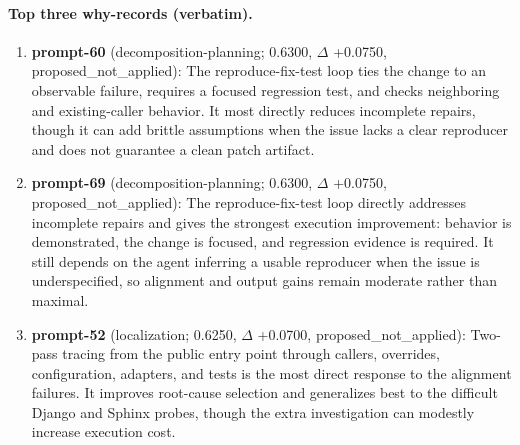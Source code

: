 \paragraph{Top three why-records (verbatim).}\begin{enumerate}\itemsep1pt
\item \textbf{prompt-60} (decomposition-planning; 0.6300, $\Delta$ +0.0750, proposed\_not\_applied): The reproduce-fix-test loop ties the change to an observable failure, requires a focused regression test, and checks neighboring and existing-caller behavior. It most directly reduces incomplete repairs, though it can add brittle assumptions when the issue lacks a clear reproducer and does not guarantee a clean patch artifact.
\item \textbf{prompt-69} (decomposition-planning; 0.6300, $\Delta$ +0.0750, proposed\_not\_applied): The reproduce-fix-test loop directly addresses incomplete repairs and gives the strongest execution improvement: behavior is demonstrated, the change is focused, and regression evidence is required. It still depends on the agent inferring a usable reproducer when the issue is underspecified, so alignment and output gains remain moderate rather than maximal.
\item \textbf{prompt-52} (localization; 0.6250, $\Delta$ +0.0700, proposed\_not\_applied): Two-pass tracing from the public entry point through callers, overrides, configuration, adapters, and tests is the most direct response to the alignment failures. It improves root-cause selection and generalizes best to the difficult Django and Sphinx probes, though the extra investigation can modestly increase execution cost.
\end{enumerate}
